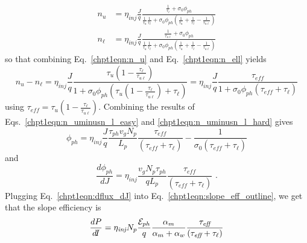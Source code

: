 {%
\begin{subequations}
\begin{align}
\label{chpt1eqn:n_u}
n_u &= \eta_\textit{inj}\frac{J}{q} \frac{\frac{1}{\tau_\ell}+\sigma_0 \phi_{ph}}{\frac{1}{\tau_u} \frac{1}{\tau_\ell}+\sigma_0 \phi_{ph} \left(\frac{1}{\tau_u} + \frac{1}{\tau_\ell} - \frac{1}{\tau_{u\ell}} \right)} \\
\label{chpt1eqn:n_ell}
n_\ell &= \eta_\textit{inj}\frac{J}{q} \frac{\frac{1}{\tau_{u\ell}}+\sigma_0 \phi_{ph}}{\frac{1}{\tau_u} \frac{1}{\tau_\ell}+\sigma_0 \phi_{ph} \left(\frac{1}{\tau_u} + \frac{1}{\tau_\ell} - \frac{1}{\tau_{u\ell}} \right)}
\end{align}
\end{subequations}
so that combining Eq.~\eqref{chpt1eqn:n_u} and Eq.~\eqref{chpt1eqn:n_ell} yields
\begin{equation}
\label{chpt1eqn:n_uminusn_l_hard}
n_u-n_\ell = \eta_\textit{inj}\frac{J}{q}  \frac{\tau_u \left(1-\frac{\tau_\ell}{\tau_{u\ell}}\right)}{1+\sigma_0 \phi_{ph} \left(\tau_u \left(1-\frac{\tau_\ell}{\tau_{u\ell}}\right) + \tau_\ell\right)} = \eta_\textit{inj}\frac{J}{q}  \frac{\tau_\textit{eff}}{1+\sigma_0 \phi_{ph} \left(\tau_\textit{eff} + \tau_\ell\right)}
\end{equation}
using $\tau_\textit{eff}=\tau_u\left(1-\frac{\tau_\ell}{\tau_{u\ell}}\right)$.
Combining the results of Eqs.~\eqref{chpt1eqn:n_uminusn_l_easy} and \eqref{chpt1eqn:n_uminusn_l_hard} gives
\begin{equation}
\phi_{ph} = \eta_\textit{inj} \frac{J}{q} \frac{\tau_{ph} v_g N_p}{L_p} \frac{\tau_\textit{eff}}{\left(\tau_\textit{eff}+\tau_\ell\right)} - \frac{1}{\sigma_0 \left(\tau_\textit{eff}+\tau_\ell\right)}
\end{equation}
and
\begin{equation}
\label{chpt1eqn:dflux_dJ}
\frac{d \phi_{ph}}{d\!J} = \eta_\textit{inj} \frac{v_g N_p \tau_{ph}}{q L_p} \frac{\tau_\textit{eff}}{\left(\tau_\textit{eff}+\tau_\ell\right)} \text{~.}
\end{equation}
Plugging Eq.~\eqref{chpt1eqn:dflux_dJ} into Eq.~\eqref{chpt1eqn:slope_eff_outline}, we get that the slope efficiency is
\begin{equation}
\frac{d P}{d\!I} = \eta_\textit{inj} N_p \frac{\EE_{ph}}{q} \frac{\alpha_m}{\alpha_m+\alpha_w}  \frac{\tau_\textit{eff}}{\left(\tau_\textit{eff}+\tau_{\ell}\right)}

\end{equation}}
